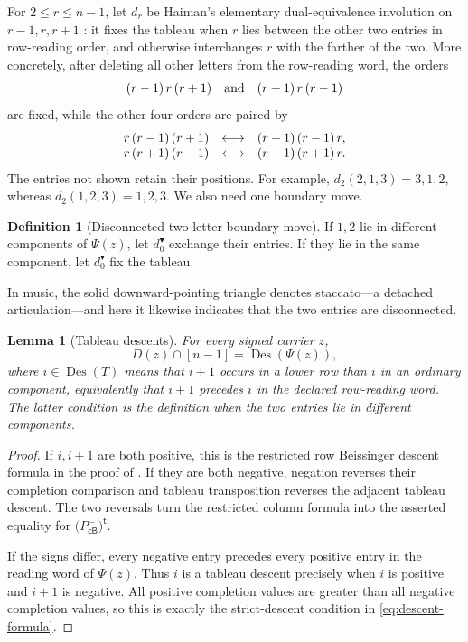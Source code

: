 \documentclass[11pt]{article}
\newtheorem{lemma}[theorem]{Lemma}
\theoremstyle{definition}
\newtheorem{definition}[theorem]{Definition}
\theoremstyle{remark}
\newcommand{\Des}{\operatorname{Des}}
\newcommand{\PCBSm}{P_{\mathsf{cB}}^{-}}
\begin{document}
For $2\leq r\leq n-1$, let $d_r$ be Haiman's elementary
dual-equivalence involution on $r-1,r,r+1$ \cite{Haiman}: it fixes the
tableau when $r$ lies between the other two entries in row-reading order,
and otherwise interchanges $r$ with the farther of the two.  More
concretely, after deleting all other letters from the row-reading word, the
orders
\[
 (r-1)\,r\,(r+1)\quad\hbox{and}\quad(r+1)\,r\,(r-1)
\]
are fixed, while the other four orders are paired by
\[
 \begin{array}{c@{\quad\longleftrightarrow\quad}c}
 r\,(r-1)\,(r+1)&(r+1)\,(r-1)\,r,\\
 r\,(r+1)\,(r-1)&(r-1)\,(r+1)\,r.
 \end{array}
\]
The entries not shown retain their positions.  For example,
$d_2(2,1,3)=3,1,2$, whereas $d_2(1,2,3)=1,2,3$.
We also need one boundary move.

\begin{definition}[Disconnected two-letter boundary move]
If $1,2$ lie in different components of $\Psi(z)$, let
$d_0^{\blacktriangledown}$ exchange their entries.  If they lie in the same
component, let $d_0^{\blacktriangledown}$ fix the tableau.
\end{definition}

In music, the solid downward-pointing triangle denotes staccato---a
detached articulation---and here it likewise indicates that the two
entries are disconnected.

\begin{lemma}[Tableau descents]
\label{lem:tableau-descents}
For every signed carrier $z$,
\[
                     D(z)\cap[n-1]=\Des(\Psi(z)),
\]
where $i\in\Des(T)$ means that $i+1$ occurs in a lower row than $i$ in
an ordinary component, equivalently that $i+1$ precedes $i$ in the
declared row-reading word.  The latter condition is the definition when
the two entries lie in different components.
\end{lemma}

\begin{proof}
If $i,i+1$ are both positive, this is the restricted row Beissinger
descent formula in the proof of \cite[Theorem~3.15]{MZInsertion}.  If they
are both negative, negation reverses their completion comparison and
tableau transposition reverses the adjacent tableau descent.  The two
reversals turn the restricted column formula
\cite[Theorem~3.18]{MZInsertion} into the asserted equality for
$\bigl(\PCBSm\bigr)^{\mathsf t}$.

If the signs differ, every negative entry precedes every positive entry in
the reading word of $\Psi(z)$.  Thus $i$ is a tableau descent precisely
when $i$ is positive and $i+1$ is negative.  All positive completion
values are greater than all negative completion values, so this is exactly
the strict-descent condition in \eqref{eq:descent-formula}.
\end{proof}
\end{document}
